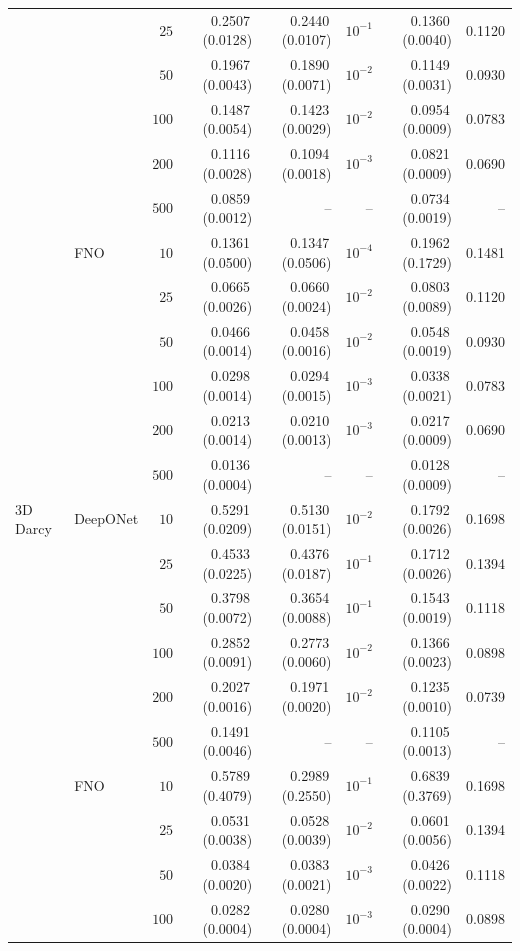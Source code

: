 \documentclass{article}
\begin{document}
{\begin{longtable}{llrrrrrr}
 &  & $25$ & 0.2507\,(0.0128) & 0.2440\,(0.0107) & $10^{-1}$ & 0.1360\,(0.0040) & 0.1120\\
 &  & $50$ & 0.1967\,(0.0043) & 0.1890\,(0.0071) & $10^{-2}$ & 0.1149\,(0.0031) & 0.0930\\
 &  & $100$ & 0.1487\,(0.0054) & 0.1423\,(0.0029) & $10^{-2}$ & 0.0954\,(0.0009) & 0.0783\\
 &  & $200$ & 0.1116\,(0.0028) & 0.1094\,(0.0018) & $10^{-3}$ & 0.0821\,(0.0009) & 0.0690\\
 &  & $500$ & 0.0859\,(0.0012) & -- & -- & 0.0734\,(0.0019) & --\\
 & FNO & $10$ & 0.1361\,(0.0500) & 0.1347\,(0.0506) & $10^{-4}$ & 0.1962\,(0.1729) & 0.1481\\
 &  & $25$ & 0.0665\,(0.0026) & 0.0660\,(0.0024) & $10^{-2}$ & 0.0803\,(0.0089) & 0.1120\\
 &  & $50$ & 0.0466\,(0.0014) & 0.0458\,(0.0016) & $10^{-2}$ & 0.0548\,(0.0019) & 0.0930\\
 &  & $100$ & 0.0298\,(0.0014) & 0.0294\,(0.0015) & $10^{-3}$ & 0.0338\,(0.0021) & 0.0783\\
 &  & $200$ & 0.0213\,(0.0014) & 0.0210\,(0.0013) & $10^{-3}$ & 0.0217\,(0.0009) & 0.0690\\
 &  & $500$ & 0.0136\,(0.0004) & -- & -- & 0.0128\,(0.0009) & --\\
3D Darcy & DeepONet & $10$ & 0.5291\,(0.0209) & 0.5130\,(0.0151) & $10^{-2}$ & 0.1792\,(0.0026) & 0.1698\\
 &  & $25$ & 0.4533\,(0.0225) & 0.4376\,(0.0187) & $10^{-1}$ & 0.1712\,(0.0026) & 0.1394\\
 &  & $50$ & 0.3798\,(0.0072) & 0.3654\,(0.0088) & $10^{-1}$ & 0.1543\,(0.0019) & 0.1118\\
 &  & $100$ & 0.2852\,(0.0091) & 0.2773\,(0.0060) & $10^{-2}$ & 0.1366\,(0.0023) & 0.0898\\
 &  & $200$ & 0.2027\,(0.0016) & 0.1971\,(0.0020) & $10^{-2}$ & 0.1235\,(0.0010) & 0.0739\\
 &  & $500$ & 0.1491\,(0.0046) & -- & -- & 0.1105\,(0.0013) & --\\
 & FNO & $10$ & 0.5789\,(0.4079) & 0.2989\,(0.2550) & $10^{-1}$ & 0.6839\,(0.3769) & 0.1698\\
 &  & $25$ & 0.0531\,(0.0038) & 0.0528\,(0.0039) & $10^{-2}$ & 0.0601\,(0.0056) & 0.1394\\
 &  & $50$ & 0.0384\,(0.0020) & 0.0383\,(0.0021) & $10^{-3}$ & 0.0426\,(0.0022) & 0.1118\\
 &  & $100$ & 0.0282\,(0.0004) & 0.0280\,(0.0004) & $10^{-3}$ & 0.0290\,(0.0004) & 0.0898\\

\end{longtable}}
\end{document}
